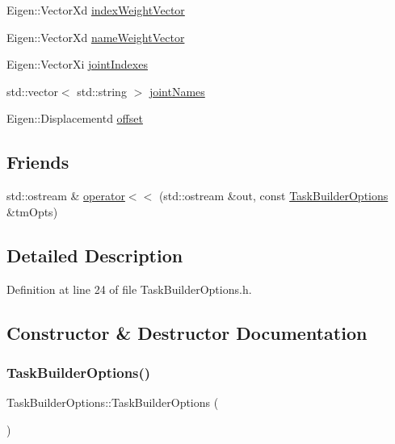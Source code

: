 \begin{DoxyCompactItemize}
\item 
Eigen\+::\+Vector\+Xd \hyperlink{classocra_1_1TaskBuilderOptions_a04ebfb8955859ffc40087d3e7b53e0d2}{index\+Weight\+Vector}
\item 
Eigen\+::\+Vector\+Xd \hyperlink{classocra_1_1TaskBuilderOptions_a82a7eaa6cb0887e59c99cc4f97d2c818}{name\+Weight\+Vector}
\item 
Eigen\+::\+Vector\+Xi \hyperlink{classocra_1_1TaskBuilderOptions_ad5c32b5777c20dc348b80959574d4a37}{joint\+Indexes}
\item 
std\+::vector$<$ std\+::string $>$ \hyperlink{classocra_1_1TaskBuilderOptions_ab72b4855028ef6965107294b16818ad2}{joint\+Names}
\item 
Eigen\+::\+Displacementd \hyperlink{classocra_1_1TaskBuilderOptions_a6c632afc050c25f7bb5631fbe7741c93}{offset}
\end{DoxyCompactItemize}
\subsection*{Friends}
\begin{DoxyCompactItemize}
\item 
std\+::ostream \& \hyperlink{classocra_1_1TaskBuilderOptions_a414b60ce008b85fc9ec6fac4e9f6f8d7}{operator$<$$<$} (std\+::ostream \&out, const \hyperlink{classocra_1_1TaskBuilderOptions}{Task\+Builder\+Options} \&tm\+Opts)
\end{DoxyCompactItemize}


\subsection{Detailed Description}


Definition at line 24 of file Task\+Builder\+Options.\+h.



\subsection{Constructor \& Destructor Documentation}
\hypertarget{classocra_1_1TaskBuilderOptions_a99045de3fc12a569cb9a2bf6b60bbc34}{}\label{classocra_1_1TaskBuilderOptions_a99045de3fc12a569cb9a2bf6b60bbc34} 
\subsubsection{\texorpdfstring{Task\+Builder\+Options()}{TaskBuilderOptions()}}
{\footnotesize\ttfamily Task\+Builder\+Options\+::\+Task\+Builder\+Options (\begin{DoxyParamCaption}{ }\end{DoxyParamCaption})}



